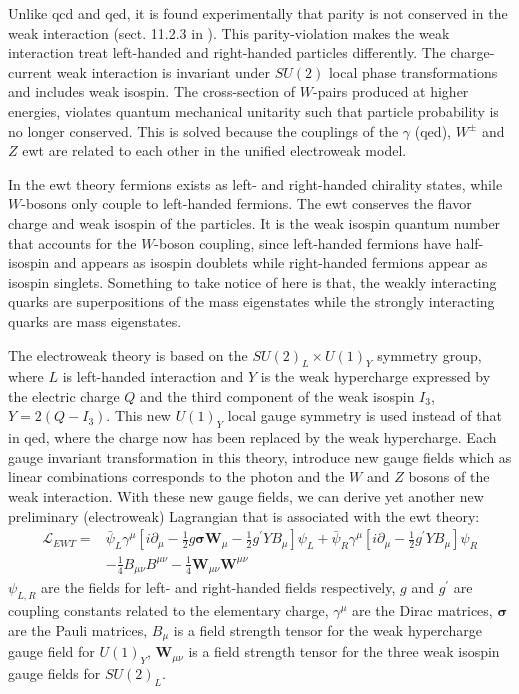 \documentclass[a4paper, american, 12pt]{report}
\begin{document}
	Unlike \acrshort{qcd} and \acrshort{qed}, it is found experimentally that parity is not conserved in the weak interaction (sect. 11.2.3 in \citet{thomson2013modern}). This parity-violation makes the weak interaction treat left-handed and right-handed particles differently. The charge-current weak interaction is invariant under $SU(2)$ local phase transformations and includes weak isospin. The cross-section of $W$-pairs produced at higher energies, violates quantum mechanical unitarity such that particle probability is no longer conserved. This is solved because the couplings of the $\gamma$ (\acrshort{qed}), $W^{\pm}$ and $Z$ \acrshort{ewt} are related to each other in the unified electroweak model.
	
	 In the \acrshort{ewt} theory fermions exists as left- and right-handed chirality states, while $W$-bosons only couple to left-handed fermions. The \acrshort{ewt} conserves the flavor charge and weak isospin of the particles. It is the weak isospin quantum number that accounts for the $W$-boson coupling, since left-handed fermions have half-isospin and appears as isospin doublets while right-handed fermions appear as isospin singlets. Something to take notice of here is that, the weakly interacting quarks are superpositions of the mass eigenstates while the strongly interacting quarks are mass eigenstates.
	
	The electroweak theory is based on the $SU(2)_L\times U(1)_Y$ symmetry group, where $L$ is left-handed interaction and $Y$ is the weak hypercharge expressed by the electric charge $Q$ and the third component of the weak isospin $I_3$, $Y=2(Q-I_3)$. This new $U(1)_Y$ local gauge symmetry is used instead of that in \acrshort{qed}, where the charge now has been replaced by the weak hypercharge. Each gauge invariant transformation in this theory, introduce new gauge fields which as linear combinations corresponds to the photon and the $W$ and $Z$ bosons of the weak interaction. With these new gauge fields, we can derive yet another new preliminary (electroweak) Lagrangian that is associated with the \acrshort{ewt} theory: 
	\begin{align}
	\label{eq:L_EWT}
		\mathcal{L}_{EWT}=& \bar{\psi}_L\gamma^{\mu}
		\left[i\partial_{\mu}-\frac{1}{2}g\boldsymbol{\sigma}\textbf{W}_{\mu}-\frac{1}{2}g^{\prime}YB_{\mu}\right]
		\psi_L +\bar{\psi}_R\gamma^{\mu}\left[i\partial_{\mu}-\frac{1}{2}g^{\prime}YB_{\mu}\right]\psi_R \nonumber\\ 
		&-\frac{1}{4}B_{\mu\nu}B^{\mu\nu} -\frac{1}{4}\textbf{W}_{\mu\nu}\textbf{W}^{\mu\nu}
	\end{align}
	$\psi_{L,R}$ are the fields for left- and right-handed fields respectively, $g$ and $g^{\prime}$ are coupling constants related to the elementary charge, $\gamma^{\mu}$ are the Dirac matrices, $\boldsymbol{\sigma}$ are the Pauli matrices, $B_{\mu}$ is a field strength tensor for the weak hypercharge gauge field for $U(1)_Y$, $\textbf{W}_{\mu\nu}$ is a field strength tensor for the three weak isospin gauge fields for $SU(2)_L$. 
	
\end{document}
